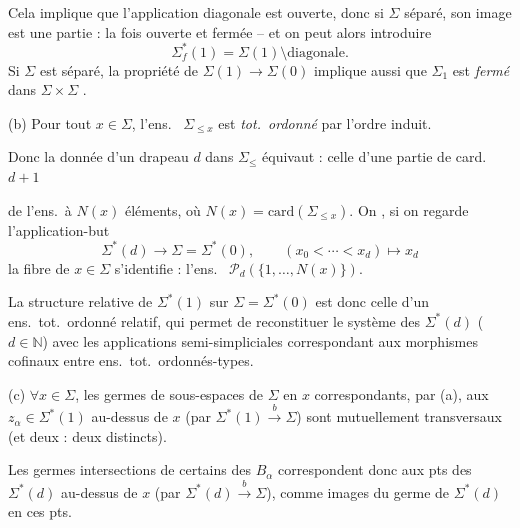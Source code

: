 \documentclass[11pt,a4paper]{article}
\begin{document}
 Cela implique  que l'application diagonale est ouverte, donc si $\Sigma$ séparé, son image est une partie : la fois ouverte et fermée -- et on peut alors introduire
\[
\Sigma^{*}_{f}(1)=\Sigma(1)\setminus\text{diagonale}.
\]
Si $\Sigma$ est séparé, la propriété de $\Sigma(1)\to\Sigma(0)$ implique aussi que $\Sigma_1$ est \emph{fermé} dans $\Sigma\times\Sigma$ .

(b) Pour tout $x\in\Sigma$, l'ens.\  $\Sigma_{\le x}$  est \emph{tot.\ ordonné} par l'ordre induit.

 Donc la donnée d'un drapeau   $d$ dans $\Sigma_{\le}$ équivaut : celle d'une partie de card.\ $d+1$


de l'ens.\ à $N(x)$ éléments, où $N(x)=\mathrm{card}(\Sigma_{\le x})$. On , si on regarde l'application-but
\[
\Sigma^{*}(d)\longrightarrow\Sigma=\Sigma^{*}(0),\qquad (x_0<\cdots<x_d)\longmapsto x_d
\]
la fibre de $x\in\Sigma$ s'identifie : l'ens.\  $\mathcal{P}_d(\lbrace 1,\ldots,N(x)\rbrace)$.

La structure relative de $\Sigma^{*}(1)$ sur $\Sigma=\Sigma^{*}(0)$ est donc celle d'un ens.\ tot.\ ordonné relatif, qui permet de reconstituer le système des $\Sigma^{*}(d)$ ($d\in\mathbb{N}$) avec les applications semi-simpliciales  correspondant aux morphismes cofinaux entre ens.\ tot.\ ordonnés-types.

(c) $\forall x\in\Sigma$, les germes  de sous-espaces  de $\Sigma$ en $x$ correspondants, par (a), aux $z_\alpha\in\Sigma^{*}(1)$ au-dessus de $x$ (par $\Sigma^{*}(1)\xrightarrow{\ b\ }\Sigma$) sont mutuellement transversaux (et deux : deux distincts).

Les germes intersections de certains des $B_\alpha$ correspondent donc aux pts des $\Sigma^{*}(d)$ au-dessus de $x$ (par $\Sigma^{*}(d)\xrightarrow{\ b\ }\Sigma$), comme images du \struck{\ill{}} germe de $\Sigma^{*}(d)$ en ces pts.
\end{document}
